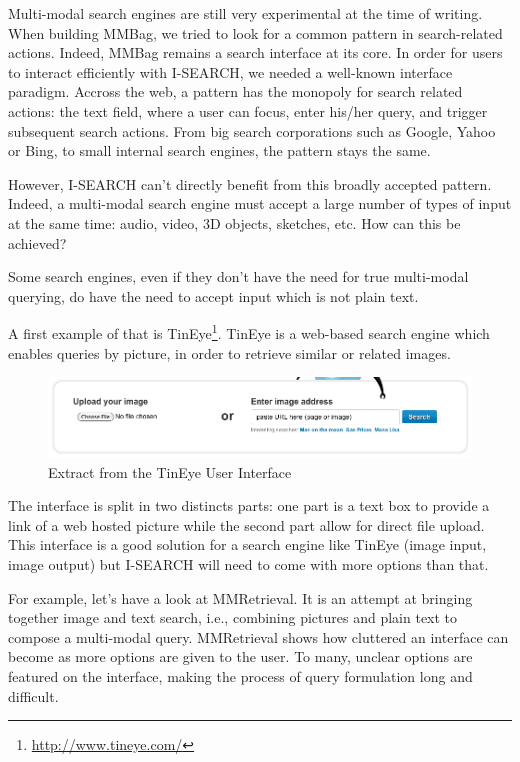 \documentclass[runningheads,a4paper]{llncs}
\begin{document}
Multi-modal search engines are still very experimental at the time of writing. When building MMBag, we tried to look for a common pattern in search-related actions. Indeed, MMBag remains a search interface at its core. In order for users to interact efficiently with I-SEARCH, we needed a well-known interface paradigm. Accross the web, a pattern has the monopoly for search related actions:  the text field, where a user can focus, enter his/her query, and trigger subsequent search actions. From big search corporations such as Google, Yahoo or Bing, to small internal search engines, the pattern stays the same. 

However, I-SEARCH can't directly benefit from this broadly accepted pattern. Indeed, a multi-modal search engine must accept a large number of types of input at the same time: audio, video, 3D objects, sketches, etc. How can this be achieved?
 
Some search engines, even if they don't have the need for true multi-modal querying, do have the need to accept input which is not plain text.

A first example of that is TinEye\footnote{\url{http://www.tineye.com/}}. TinEye is a web-based search engine which enables queries by picture, in order to retrieve similar or related images. 
\begin{figure}[h!]
  \centering
    \includegraphics[width=0.8\linewidth]{resources/tineye-UI.png}
  \caption{Extract from the TinEye User Interface}
  \label{fig:tineye-ui}
\end{figure}

The interface is split in two distincts parts: one part is a text box to provide a link of a web hosted picture while the second part allow for direct file upload. This interface is a good solution for a search engine like TinEye (image input, image output) but I-SEARCH will need to come with more options than that.

 For example, let's have a look at MMRetrieval. It is an attempt at bringing together image and text search, i.e., combining pictures and plain text to compose a multi-modal query. MMRetrieval shows how cluttered an interface can become as more options are given to the user. To many, unclear  options are featured on the interface, making the process of query formulation long and difficult.
\end{document}
